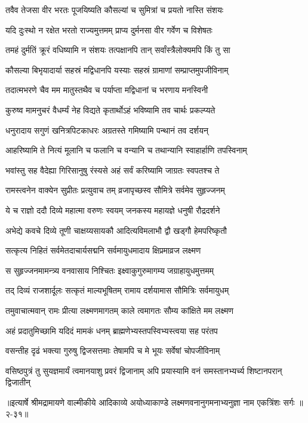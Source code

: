\twolineshloka
{तवैव तेजसा वीर भरतः पूजयिष्यति}
{कौसल्यां च सुमित्रां च प्रयतो नास्ति संशयः} %

\twolineshloka
{यदि दुःस्थो न रक्षेत भरतो राज्यमुत्तमम्}
{प्राप्य दुर्मनसा वीर गर्वेण च विशेषतः} %

\twolineshloka
{तमहं दुर्मतिं क्रूरं वधिष्यामि न संशयः}
{तत्पक्षानपि तान् सर्वांस्त्रैलोक्यमपि किं तु सा} %

\twolineshloka
{कौसल्या बिभृयादार्या सहस्रं मद्विधानपि}
{यस्याः सहस्रं ग्रामाणां सम्प्राप्तमुपजीविनाम्} %

\twolineshloka
{तदात्मभरणे चैव मम मातुस्तथैव च}
{पर्याप्ता मद्विधानां च भरणाय मनस्विनी} %

\twolineshloka
{कुरुष्व मामनुचरं वैधर्म्यं नेह विद्यते}
{कृतार्थोऽहं भविष्यामि तव चार्थः प्रकल्प्यते} %

\twolineshloka
{धनुरादाय सगुणं खनित्रपिटकाधरः}
{अग्रतस्ते गमिष्यामि पन्थानं तव दर्शयन्} %

\twolineshloka
{आहरिष्यामि ते नित्यं मूलानि च फलानि च}
{वन्यानि च तथान्यानि स्वाहार्हाणि तपस्विनाम्} %

\twolineshloka
{भवांस्तु सह वैदेह्या गिरिसानुषु रंस्यसे}
{अहं सर्वं करिष्यामि जाग्रतः स्वपतश्च ते} %

\twolineshloka
{रामस्त्वनेन वाक्येन सुप्रीतः प्रत्युवाच तम्}
{व्रजापृच्छस्व सौमित्रे सर्वमेव सुहृज्जनम्} %

\twolineshloka
{ये च राज्ञो ददौ दिव्ये महात्मा वरुणः स्वयम्}
{जनकस्य महायज्ञे धनुषी रौद्रदर्शने} %

\twolineshloka
{अभेद्ये कवचे दिव्ये तूणी चाक्षय्यसायकौ}
{आदित्यविमलाभौ द्वौ खड्गौ हेमपरिष्कृतौ} %

\twolineshloka
{सत्कृत्य निहितं सर्वमेतदाचार्यसद्मनि}
{सर्वमायुधमादाय क्षिप्रमाव्रज लक्ष्मण} %

\twolineshloka
{स सुहृज्जनमामन्त्र्य वनवासाय निश्चितः}
{इक्ष्वाकुगुरुमागम्य जग्राहायुधमुत्तमम्} %

\twolineshloka
{तद् दिव्यं राजशार्दूलः सत्कृतं माल्यभूषितम्}
{रामाय दर्शयामास सौमित्रिः सर्वमायुधम्} %

\twolineshloka
{तमुवाचात्मवान् रामः प्रीत्या लक्ष्मणमागतम्}
{काले त्वमागतः सौम्य कांक्षिते मम लक्ष्मण} %

\twolineshloka
{अहं प्रदातुमिच्छामि यदिदं मामकं धनम्}
{ब्राह्मणेभ्यस्तपस्विभ्यस्त्वया सह परंतप} %

\twolineshloka
{वसन्तीह दृढं भक्त्या गुरुषु द्विजसत्तमाः}
{तेषामपि च मे भूयः सर्वेषां चोपजीविनाम्} %

\twolineshloka
{वसिष्ठपुत्रं तु सुयज्ञमार्यं त्वमानयाशु प्रवरं द्विजानाम्}
{अपि प्रयास्यामि वनं समस्तानभ्यर्च्य शिष्टानपरान् द्विजातीन्} %


॥इत्यार्षे श्रीमद्रामायणे वाल्मीकीये आदिकाव्ये अयोध्याकाण्डे लक्ष्मणवनानुगमनाभ्यनुज्ञा नाम एकत्रिंशः सर्गः ॥२-३१॥
